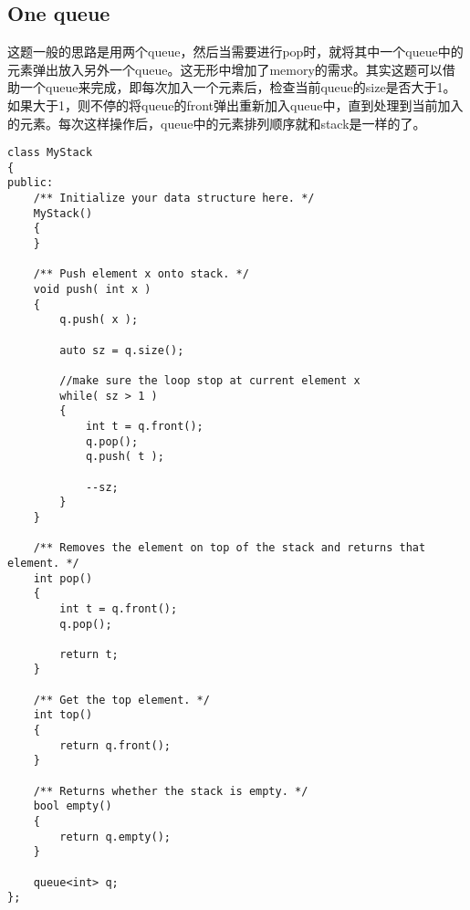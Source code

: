 \subsection{One queue}
\begin{CJK*}{UTF8}{gbsn}
这题一般的思路是用两个queue，然后当需要进行pop时，就将其中一个queue中的元素弹出放入另外一个queue。这无形中增加了memory的需求。其实这题可以借助一个queue来完成，即每次加入一个元素后，检查当前queue的size是否大于1。 如果大于1，则不停的将queue的front弹出重新加入queue中，直到处理到当前加入的元素。每次这样操作后，queue中的元素排列顺序就和stack是一样的了。
\end{CJK*}
\setcounter{lstlisting}{0}
\begin{lstlisting}[style=customc, caption={Queue}]
class MyStack
{
public:
    /** Initialize your data structure here. */
    MyStack()
    {
    }

    /** Push element x onto stack. */
    void push( int x )
    {
        q.push( x );

        auto sz = q.size();

		//make sure the loop stop at current element x
        while( sz > 1 )
        {
            int t = q.front();
            q.pop();
            q.push( t );

            --sz;
        }
    }

    /** Removes the element on top of the stack and returns that element. */
    int pop()
    {
        int t = q.front();
        q.pop();

        return t;
    }

    /** Get the top element. */
    int top()
    {
        return q.front();
    }

    /** Returns whether the stack is empty. */
    bool empty()
    {
        return q.empty();
    }

    queue<int> q;
};


\end{lstlisting}